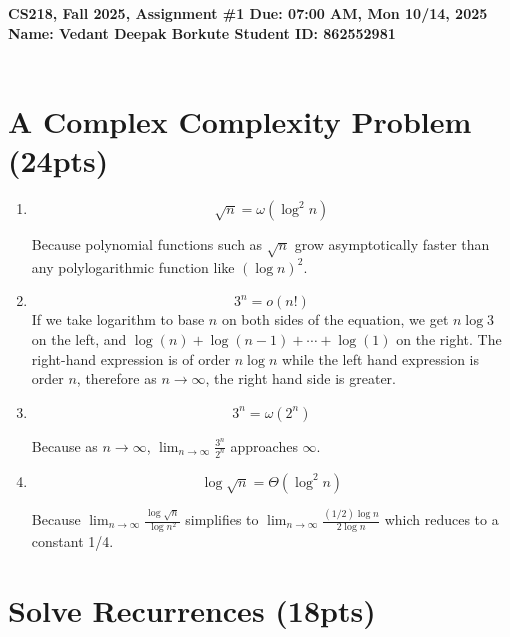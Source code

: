 \documentclass{article}[12pt]
\newcommand{\deadline}{07:00 AM, Mon 10/14, 2025}
\newcommand{\assigntitle}[1]{{
  \noindent \large \bf
  CS218, Fall 2025,
  Assignment \##1 \hfill Due: {\deadline}\\
  Name: Vedant Deepak Borkute
  \hspace{2.5in}
  Student ID: 862552981
  \\
  [-.05in]
  \mbox{}\hrulefill \mbox{}\\}}
\begin{document}
\assigntitle{1}{}
\date{}


\section{A Complex Complexity Problem (24pts)}
\begin{enumerate}

\item \[
\sqrt{n} = \omega\!\left(\log ^{2} n\right)
\]

Because polynomial functions such as $\sqrt{n}$ grow asymptotically faster than any polylogarithmic function like $(\log n)^2$. 

\item \[
3^n = o\!\left(n!\right)
\]
If we take logarithm to base $n$ on both sides of the equation, we get $n \log 3$ on the left, and $\log(n) + \log(n-1) + \cdots + \log(1)$ on the right. The right-hand expression is of order $n \log n$ while the left hand expression is order $n$, therefore as $n \to \infty$, the right hand side is greater. 

\item \[
3^n = \omega(2^n)\]

Because as $n \to \infty$, $\lim_{n \to \infty}\frac{3^n}{2^n}$  approaches $\infty$.

\item \[
\log{\sqrt{n}} = \Theta(\log^{2} n)
\]

Because $\lim_{n \to \infty} \frac{\log{\sqrt{n}}}{\log{n^2}}$ simplifies to $\lim_{n \to \infty} \frac{(1/2)\log{n}}{2\log{n}}$ which reduces to a constant 1/4.
\end{enumerate}

\section{Solve Recurrences (18pts)}
\end{document}
